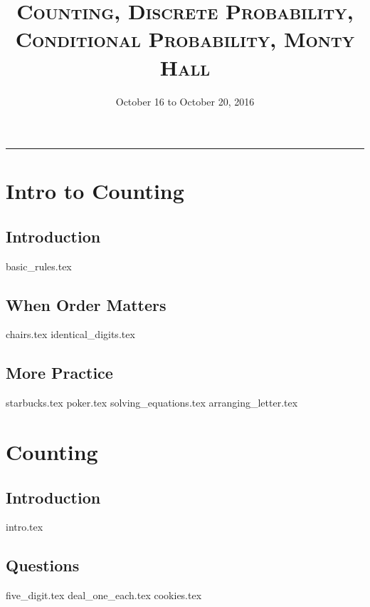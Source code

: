 \documentclass{exam}
\title{\textsc{Counting, Discrete Probability, Conditional Probability, Monty Hall}}
\date{October 16 to October 20, 2016}
\begin{document}
\maketitle
\rule{\textwidth}{0.15em}
\fontsize{12}{15}\selectfont
\thispagestyle{empty}


\section{Intro to Counting}
\subsection{Introduction}
{basic_rules.tex}
\subsection{When Order Matters}
\begin{questions}
{chairs.tex}
{identical_digits.tex}
\end{questions}
\subsection{More Practice}
\begin{questions}
{starbucks.tex}
{poker.tex}
{solving_equations.tex}
{arranging_letter.tex}
\end{questions}

\section{Counting}
\subsection{Introduction}
{intro.tex}
\subsection{Questions}
\begin{questions}
{five_digit.tex}
{deal_one_each.tex}
{cookies.tex}
\end{questions}
\end{document}
